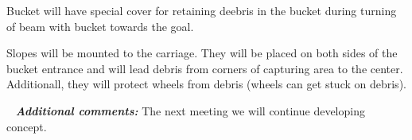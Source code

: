 \begin{enumerate*}
  	Bucket will have special cover for retaining deebris in the bucket during turning of beam with bucket towards the goal.
  	\begin{figure}[H]
  		\begin{minipage}[h]{1\linewidth}
  		  \caption{}
  		\end{minipage}
  	\end{figure}
  	\item Slopes will be mounted to the carriage. They will be placed on both sides of the bucket entrance and will lead debris from corners of capturing area to the center. Additionall, they will protect wheels from debris (wheels can get stuck on debris).
  	\begin{figure}[H]
  		\begin{minipage}[h]{1\linewidth}
  		  \caption{}
  		\end{minipage}
  	\end{figure}
  	
  \end{enumerate*}
  
   \newline
  \textit{\textbf{Additional comments:}} The next meeting we will continue developing concept.

\fillpage
